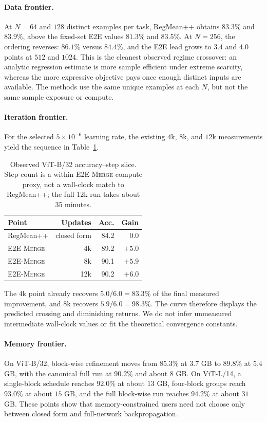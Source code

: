 \documentclass[letterpaper]{article} %
\newcommand{\method}{\textup{\textsc{E2E-Merge}}\xspace}
\theoremstyle{plain}
\theoremstyle{definition}
\begin{document}
\paragraph{Data frontier.}
At $N=64$ and $128$ distinct examples per task, RegMean++ obtains $83.3\%$ and $83.9\%$,
above the fixed-set E2E values $81.3\%$ and $83.5\%$. At $N=256$, the ordering reverses:
$86.1\%$ versus $84.4\%$, and the E2E lead grows to $3.4$ and $4.0$ points at $512$ and
$1024$. This is the cleanest observed regime crossover: an analytic regression estimate is
more sample efficient under extreme scarcity, whereas the more expressive objective pays
once enough distinct inputs are available. The methods use the same unique examples at
each $N$, but not the same sample exposure or compute.

\paragraph{Iteration frontier.}
For the selected $5\times10^{-6}$ learning rate, the existing $4$k, $8$k, and $12$k
measurements yield the sequence in Table~\ref{tab:step-increments}.
\begin{table}[tb]
\centering
\small
\setlength{\tabcolsep}{4pt}
\begin{tabular*}{\columnwidth}{@{\extracolsep{\fill}}lrrr}
\toprule
Point & Updates & Acc. & Gain \\
\midrule
RegMean++ & closed form & 84.2 & 0.0 \\
\method & 4k & 89.2 & $+5.0$ \\
\method & 8k & 90.1 & $+5.9$ \\
\method & 12k & 90.2 & $+6.0$ \\
\bottomrule
\end{tabular*}
\caption{Observed ViT-B/32 accuracy--step slice. Step count is a within-\method compute
proxy, not a wall-clock match to RegMean++; the full 12k run takes about 35 minutes.}
\label{tab:step-increments}
\end{table}
The $4$k point already recovers $5.0/6.0=83.3\%$ of the final measured improvement, and
$8$k recovers $5.9/6.0=98.3\%$. The curve therefore displays the predicted crossing and
diminishing returns. We do not infer unmeasured intermediate wall-clock values or fit the
theoretical convergence constants.

\paragraph{Memory frontier.}
On ViT-B/32, block-wise refinement moves from $85.3\%$ at $3.7$ GB to $89.8\%$ at $5.4$
GB, with the canonical full run at $90.2\%$ and about $8$ GB. On ViT-L/14, a single-block
schedule reaches $92.0\%$ at about $13$ GB, four-block groups reach $93.0\%$ at about $15$
GB, and the full block-wise run reaches $94.2\%$ at about $31$ GB. These points show that
memory-constrained users need not choose only between closed form and full-network
backpropagation.
\end{document}
